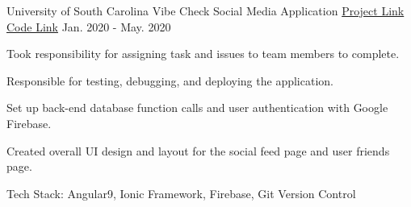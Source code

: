 \begin{cventries}
    \cventry
    {University of South Carolina} %
    {{Vibe Check Social Media Application}} %
    {\href{https://youtu.be/b_Kv6etAXbw}{Project Link } \href{https://github.com/zmiguel2016/vibeCheck}{ Code Link}} %
    {Jan. 2020 - May. 2020} %
    {
      \begin{cvitems} %
        \item {Took responsibility for assigning task and issues to team members to complete.}
        \item {Responsible for testing, debugging, and deploying the application.}
        \item {Set up back-end database function calls and user authentication with Google Firebase.}
         \item {Created overall UI design and layout for the social feed page and user friends page.}
         \item {Tech Stack: Angular9, Ionic Framework, Firebase, Git Version Control }
      \end{cvitems}
    }
    
\end{cventries}